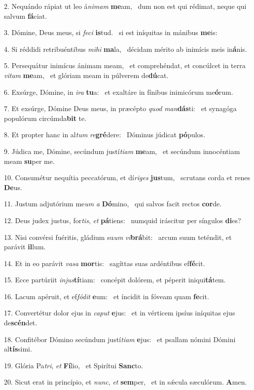 2. Nequándo rápiat ut leo á\textit{ni}\textit{mam} \textbf{me}am, \ast\  dum non est qui rédimat, neque qui salvum \textbf{fá}ciat.\

3. Dómine, Deus meus, si \textit{fe}\textit{ci} \textbf{is}tud. \ast\  si est iníquitas in mánibus \textbf{me}is:\

4. Si réddidi retribuéntibus \textit{mi}\textit{hi} \textbf{ma}la, \ast\  décidam mérito ab inimícis meis in\textbf{á}nis.\

5. Persequátur inimícus ánimam meam, \dag\  et comprehéndat, et concúlcet in terra \textit{vi}\textit{tam} \textbf{me}am, \ast\  et glóriam meam in púlverem de\textbf{dú}cat.\

6. Exsúrge, Dómine, in \textit{i}\textit{ra} \textbf{tu}a: \ast\  et exaltáre in fínibus inimicórum me\textbf{ó}rum.\

7. Et exsúrge, Dómine Deus meus, in præcépto \textit{quod} \textit{man}\textbf{dás}ti: \ast\  et synagóga populórum circúmda\textbf{bit} te.\

8. Et propter hanc in al\textit{tum} \textit{re}\textbf{gré}dere: \ast\  Dóminus júdicat \textbf{pó}pulos.\

9. Júdica me, Dómine, secúndum justí\textit{ti}\textit{am} \textbf{me}am, \ast\  et secúndum innocéntiam meam \textbf{su}per me.\

10. Consumétur nequítia peccatórum, et dí\textit{ri}\textit{ges} \textbf{jus}tum, \ast\  scrutans corda et renes \textbf{De}us.\

11. Justum adjutórium me\textit{um} \textit{a} \textbf{Dó}mino, \ast\  qui salvos facit rectos \textbf{cor}de.\

12. Deus judex justus, for\textit{tis}, \textit{et} \textbf{pá}tiens: \ast\  numquid iráscitur per síngulos \textbf{di}es?\

13. Nisi convérsi fuéritis, gládium su\textit{um} \textit{vi}\textbf{brá}bit: \ast\  arcum suum teténdit, et parávit \textbf{il}lum.\

14. Et in eo parávit \textit{va}\textit{sa} \textbf{mor}tis: \ast\  sagíttas suas ardéntibus ef\textbf{fé}cit.\

15. Ecce partúriit \textit{in}\textit{jus}\textbf{tí}tiam: \ast\  concépit dolórem, et péperit iniqui\textbf{tá}tem.\

16. Lacum apéruit, et ef\textit{fó}\textit{dit} \textbf{e}um: \ast\  et íncidit in fóveam quam \textbf{fe}cit.\

17. Convertétur dolor ejus in \textit{ca}\textit{put} \textbf{e}jus: \ast\  et in vérticem ipsíus iníquitas ejus de\textbf{scén}det.\

18. Confitébor Dómino secúndum justí\textit{ti}\textit{am} \textbf{e}jus: \ast\  et psallam nómini Dómini al\textbf{tís}simi.\

19. Glória Pa\textit{tri}, \textit{et} \textbf{Fí}lio, \ast\  et Spirítui \textbf{Sanc}to.\

20. Sicut erat in princípio, et \textit{nunc}, \textit{et} \textbf{sem}per, \ast\  et in sǽcula sæculórum. \textbf{A}men.\

